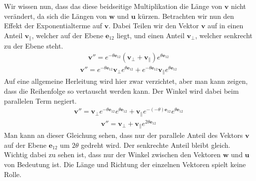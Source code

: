Wir wissen nun, dass das diese beidseitige Multiplikation die Länge von $\mathbf{v}$ nicht verändert, da sich die Längen von $\mathbf{w}$ und $\mathbf{u}$ kürzen. Betrachten wir nun den Effekt der Exponentialterme auf $\mathbf{v}$. Dabei Teilen wir den Vektor $\mathbf{v}$ auf in einen Anteil $\mathbf{v_\parallel}$, welcher auf der Ebene $\mathbf{e}_{12}$ liegt, und einen Anteil $\mathbf{v_\perp}$, welcher senkrecht zu der Ebene steht.
\begin{align} \label{RotAufPerpPar}
	\mathbf{v}'' = e^{-\theta \mathbf{e}_{12}} (\mathbf{v_\perp + v_\parallel}) e^{\theta \mathbf{e}_{12}}
\end{align}
\begin{align}
	\mathbf{v}'' = e^{-\theta \mathbf{e}_{12}} \mathbf{v_\perp} e^{\theta \mathbf{e}_{12}} + e^{-\theta \mathbf{e}_{12}} \mathbf{v_\parallel} e^{\theta \mathbf{e}_{12}}
\end{align}
Auf eine allgemeine Herleitung wird hier zwar verzichtet, aber man kann zeigen, dass die Reihenfolge so vertauscht werden kann. Der Winkel wird dabei beim parallelen Term negiert.
\begin{align}
	\mathbf{v}'' = \mathbf{v_\perp} e^{-\theta \mathbf{e}_{12}}  e^{\theta \mathbf{e}_{12}} +  \mathbf{v_\parallel} e^{-(-\theta) \mathbf{e}_{12}} e^{\theta \mathbf{e}_{12}}
\end{align}
\begin{align}
	\mathbf{v}'' = \mathbf{v_\perp} +  \mathbf{v_\parallel} e^{2\theta \mathbf{e}_{12}}
\end{align}
Man kann an dieser Gleichung sehen, dass nur der parallele Anteil des Vektors $\mathbf{v}$ auf der Ebene $\mathbf{e}_{12}$ um $2\theta$ gedreht wird. Der senkrechte Anteil bleibt gleich. Wichtig dabei zu sehen ist, dass nur der Winkel zwischen den Vektoren $\mathbf{w}$ und $\mathbf{u}$ von Bedeutung ist. Die Länge und Richtung der einzelnen Vektoren spielt keine Rolle. 
